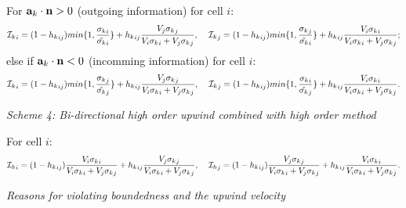 \noindent
For ${\bf a}_k\cdot {\bf n}>0$ (outgoing information) for cell $i$:
\begin{equation}
{{\cal I}_k}_i = (1-{h_k}_{ij}) min\{ 1, \frac{{\sigma_k}_i}{\tilde{\sigma_k}_i}  \}
+ {h_k}_{ij}\frac{ V_j{\sigma_k}_j }{ V_i{\sigma_k}_i + V_j{\sigma_k}_j },  \;\;\;\;
{{\cal I}_k}_j = (1-{h_k}_{ij}) min\{ 1, \frac{{\sigma_k}_j}{\tilde{\sigma_k}_i}  \}
+ {h_k}_{ij}\frac{ V_i{\sigma_k}_i }{ V_i{\sigma_k}_i + V_j{\sigma_k}_j };
\end{equation}
else if ${\bf a}_k\cdot {\bf n}<0$ (incomming information) for cell $i$:
\begin{equation}
{{\cal I}_k}_i = (1-{h_k}_{ij}) min\{ 1, \frac{{\sigma_k}_j}{\tilde{\sigma_k}_j}  \}
+ {h_k}_{ij}\frac{ V_j{\sigma_k}_j }{ V_i{\sigma_k}_i + V_j{\sigma_k}_j },  \;\;\;\;
{{\cal I}_k}_j = (1-{h_k}_{ij}) min\{ 1, \frac{{\sigma_k}_i}{\tilde{\sigma_k}_j}  \}
+ {h_k}_{ij}\frac{ V_i{\sigma_k}_i }{ V_i{\sigma_k}_i + V_j{\sigma_k}_j }.
\end{equation}


\vspace{1cm}
\noindent
{\it Scheme 4: Bi-directional high order upwind combined with high order method}

\noindent
For cell $i$:
\begin{equation}
{{\cal I}_h}_i = (1-{h_k}_{ij}) \frac{ V_i{\sigma_k}_i }{ V_i{\sigma_k}_i + V_j{\sigma_k}_j }
+ {h_k}_{ij}\frac{ V_j{\sigma_k}_j }{ V_i{\sigma_k}_i + V_j{\sigma_k}_j },  \;\;\;\;
{{\cal I}_h}_j = (1-{h_k}_{ij}) \frac{ V_j{\sigma_k}_j }{ V_i{\sigma_k}_i + V_j{\sigma_k}_j }
+ {h_k}_{ij}\frac{ V_i{\sigma_k}_i }{ V_i{\sigma_k}_i + V_j{\sigma_k}_j }.
\end{equation}



\vspace{1cm}
\noindent
{\it Reasons for violating boundedness and the upwind velocity}

